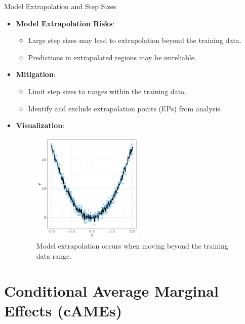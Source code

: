 \documentclass[11pt,compress,t,notes=noshow, aspectratio=169, xcolor=table]{beamer}
\begin{document}
\begin{frame}{Model Extrapolation and Step Sizes}
\begin{itemize}
\item \textbf{Model Extrapolation Risks}:
\begin{itemize}
\item Large step sizes may lead to extrapolation beyond the training data.
\item Predictions in extrapolated regions may be unreliable.
\end{itemize}
\item \textbf{Mitigation}:
\begin{itemize}
\item Limit step sizes to ranges within the training data.
\item Identify and exclude extrapolation points (EPs) from analysis.
\end{itemize}
\item \textbf{Visualization}:
\begin{figure}
  \centering
  \includegraphics[width=0.5\textwidth]{figure-man/uniform_extrapolation_data.png}
  \caption{Model extrapolation occurs when moving beyond the training data range.}
\end{figure}
\end{itemize}
\end{frame}

\section{Conditional Average Marginal Effects (cAMEs)}
\end{document}
